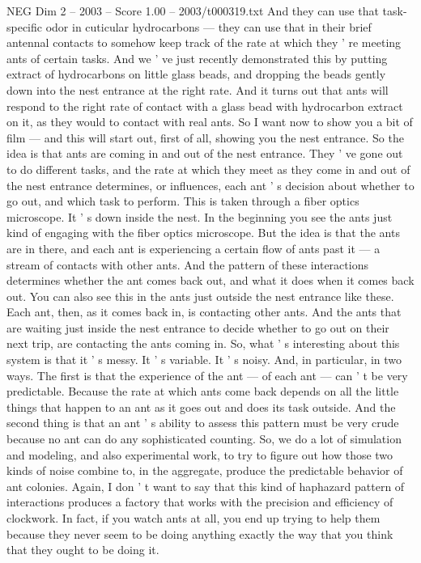 \begin{textsample}{NEG Dim 2 – 2003 – Score 1.00 – 2003/t000319.txt}
And they can use that task-specific odor in cuticular hydrocarbons — they can use that in their brief antennal contacts to somehow keep track of the rate at which they ' re meeting ants of certain tasks.
And we ' ve just recently demonstrated this by putting extract of hydrocarbons on little glass beads, and dropping the beads gently down into the nest entrance at the right rate.
And it turns out that ants will respond to the right rate of contact with a glass bead with hydrocarbon extract on it, as they would to contact with real ants.
So I want now to show you a bit of film — and this will start out, first of all, showing you the nest entrance.
So the idea is that ants are coming in and out of the nest entrance.
They ' ve gone out to do different tasks, and the rate at which they meet as they come in and out of the nest entrance determines, or influences, each ant ' s decision about whether to go out, and which task to perform.
This is taken through a fiber optics microscope.
It ' s down inside the nest.
In the beginning you see the ants just kind of engaging with the fiber optics microscope.
But the idea is that the ants are in there, and each ant is experiencing a certain flow of ants past it — a stream of contacts with other ants.
And the pattern of these interactions determines whether the ant comes back out, and what it does when it comes back out.
You can also see this in the ants just outside the nest entrance like these.
Each ant, then, as it comes back in, is contacting other ants.
And the ants that are waiting just inside the nest entrance to decide whether to go out on their next trip, are contacting the ants coming in.
So, what ' s interesting about this system is that it ' s messy.
It ' s variable.
It ' s noisy.
And, in particular, in two ways.
The first is that the experience of the ant — of each ant — can ' t be very predictable.
Because the rate at which ants come back depends on all the little things that happen to an ant as it goes out and does its task outside.
And the second thing is that an ant ' s ability to assess this pattern must be very crude because no ant can do any sophisticated counting.
So, we do a lot of simulation and modeling, and also experimental work, to try to figure out how those two kinds of noise combine to, in the aggregate, produce the predictable behavior of ant colonies.
Again, I don ' t want to say that this kind of haphazard pattern of interactions produces a factory that works with the precision and efficiency of clockwork.
In fact, if you watch ants at all, you end up trying to help them because they never seem to be doing anything exactly the way that you think that they ought to be doing it.

\end{textsample}
